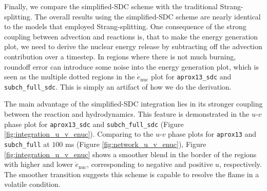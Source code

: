 \documentclass[preprint,times,tighten,linenumbers]{aastex631}
\begin{document}
\begin{figure*}
\centering
{}
\caption{\label{fig:integration_enuc} Slice plots comparing $\dot{e}_{\textrm{nuc}}$ for {\tt aprox13\_sdc} (top panel) and {\tt subch\_full\_sdc} (bottom panel) at $t = 50$ ms.}
\end{figure*}


Finally, we compare the simplified-SDC scheme with the traditional Strang-splitting. The overall results using the simplified-SDC scheme are nearly identical to the models that employed Strang-splitting.
One consequence of the strong coupling between advection and reactions is, that to make the energy generation plot, we need to derive the nuclear energy release by subtracting off the advection contribution over a timestep.  In regions where there is not much burning, roundoff error can introduce some noise into the energy generation plot, which is seen as the multiple dotted regions in the $\dot{e}_{\textrm{nuc}}$ plot for {\tt aprox13\_sdc} and {\tt subch\_full\_sdc}.  This is simply an artifact of how we do
the derivation.


\begin{figure*}
\centering
{}
\caption{\label{fig:integration_u_v_enuc} $u-v$ phase plots for {\tt aprox13\_sdc} (left panel) and {\tt subch\_full\_sdc} (right panel) at $t = 100$ms.}
\end{figure*}


The main advantage of the simplified-SDC integration lies in its stronger coupling between the reaction and hydrodynamics. This feature is demonstrated in the $u$-$v$ phase plot for {\tt aprox13\_sdc} and {\tt subch\_full\_sdc} (Figure \ref{fig:integration_u_v_enuc}). Comparing to the $u$-$v$ phase plots for {\tt aprox13} and {\tt subch\_full} at $100$ ms (Figure \ref{fig:network_u_v_enuc}), Figure \ref{fig:integration_u_v_enuc} shows a smoother blend in the border of the regions with higher and lower $\dot{e}_{\textrm{nuc}}$, corresponding to negative and positive $u$, respectively. The smoother transition suggests this scheme is capable to resolve the flame in a volatile condition. 
\end{document}
